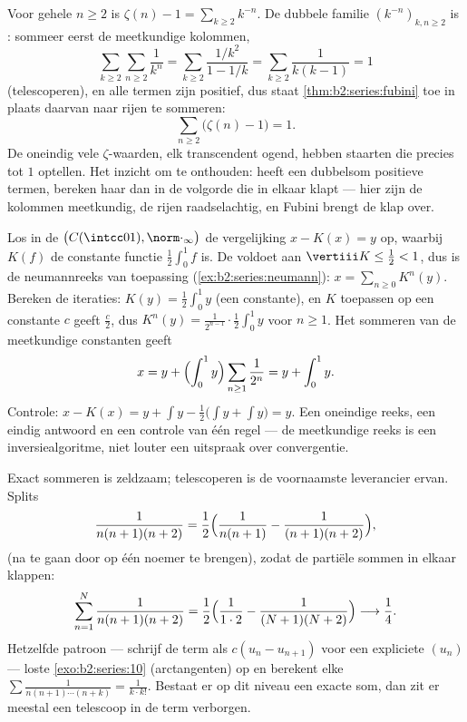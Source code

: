 \begin{example}[Een berekening met Fubini: $\sum_n (\zeta(n) - 1) = 1$]\label{ex:b2:series:zetasum}
Voor gehele $n \geq 2$ is $\zeta(n) - 1 = \sum_{k \geq 2} k^{-n}$.
De dubbele familie $(k^{-n})_{k, n \geq 2}$ is : sommeer
eerst de meetkundige kolommen,
\[
\sum_{k\geq2}\sum_{n\geq2} \frac{1}{k^n}
= \sum_{k\geq2} \frac{1/k^2}{1 - 1/k}
= \sum_{k\geq2} \frac{1}{k(k-1)} = 1
\]
(telescoperen), en alle termen zijn positief, dus staat
\cref{thm:b2:series:fubini} toe in plaats daarvan naar rijen te
sommeren:
\[
\sum_{n\geq2}\bigl(\zeta(n) - 1\bigr) = 1 .
\]
De oneindig vele $\zeta$-waarden, elk transcendent ogend, hebben
staarten die precies tot $1$ optellen. Het inzicht om te onthouden:
heeft een dubbelsom positieve termen, bereken haar dan in de
volgorde die in elkaar klapt --- hier zijn de kolommen meetkundig,
de rijen raadselachtig, en Fubini brengt de klap over.
\end{example}

\begin{example}\label{ex:b2:series:neumannsolve}
Los in de  $\bigl(C(\intcc01),
\norm\cdot_\infty\bigr)$ de vergelijking $x - K(x) = y$ op, waarbij
$K(f)$ de constante functie $\frac12\int_0^1 f$ is. De 
voldoet aan $\vertiii K \leq \frac12 < 1$, dus is de neumannreeks
van toepassing (\cref{ex:b2:series:neumann}): $x = \sum_{n\geq0}
K^n(y)$. Bereken de iteraties: $K(y) = \frac12\int_0^1 y$ (een
constante), en $K$ toepassen op een constante $c$ geeft $\frac
c2$, dus $K^n(y) = \frac{1}{2^{n-1}}\cdot\frac12\int_0^1 y$ voor
$n \geq 1$. Het sommeren van de meetkundige constanten geeft
\[
x = y + \Bigl(\int_0^1 y\Bigr)
\sum_{n\geq1}\frac{1}{2^n} = y + \int_0^1 y .
\]
Controle: $x - K(x) = y + \int y - \frac12\bigl(\int y + \int
y\bigr) = y$. Een oneindige reeks, een eindig antwoord en een
controle van één regel --- de meetkundige reeks is een
inversiealgoritme, niet louter een uitspraak over convergentie.
\end{example}

\begin{example}\label{ex:b2:series:telescope}
Exact sommeren is zeldzaam; telescoperen is de voornaamste
leverancier ervan. Splits
\[
\frac{1}{n(n+1)(n+2)}
= \frac{1}{2}\Bigl(\frac{1}{n(n+1)} -
\frac{1}{(n+1)(n+2)}\Bigr),
\]
(na te gaan door op één noemer te brengen), zodat de partiële
sommen in elkaar klappen:
\[
\sum_{n=1}^{N}\frac{1}{n(n+1)(n+2)}
= \frac12\Bigl(\frac{1}{1\cdot2} -
\frac{1}{(N+1)(N+2)}\Bigr)
\longrightarrow \frac14 .
\]
Hetzelfde patroon --- schrijf de term als $c(u_n - u_{n+1})$ voor
een expliciete $(u_n)$ --- loste \cref{exo:b2:series:10}
(arctangenten) op en berekent elke $\sum\frac{1}{n(n+1)\cdots(n +
k)} = \frac{1}{k\cdot k!}$. Bestaat er op dit niveau een exacte
som, dan zit er meestal een telescoop in de term verborgen.
\end{example}

